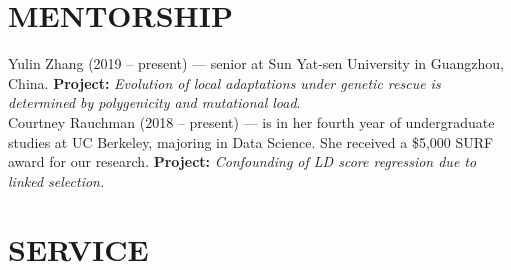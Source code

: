 \documentclass[margin, 10pt]{res} %
\begin{document}
\begin{resume}
\section{MENTORSHIP}

Yulin Zhang (2019 -- present) --- senior at Sun Yat-sen University in Guangzhou, China. {\bf Project:} {\it Evolution of local adaptations under genetic rescue is determined by polygenicity and mutational load}.  \vspace{0.1cm}\\
Courtney Rauchman (2018 -- present) --- is in her fourth year of undergraduate studies at UC Berkeley, majoring in Data Science. She received a \$5,000 SURF award for our research. {\bf Project:} {\it Confounding of LD score regression due to linked selection.}
 




\section{SERVICE}


\end{resume}
\end{document}

